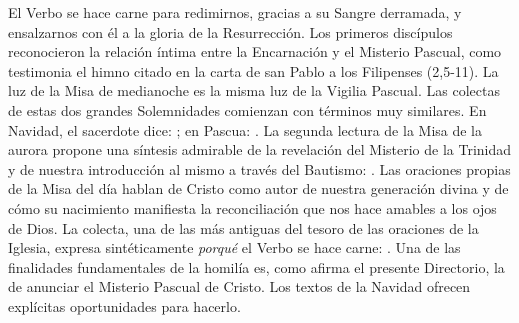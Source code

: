 \begin{body}
\begin{body}
El Verbo se hace carne para redimirnos, gracias a su Sangre derramada, y ensalzarnos con él a la gloria de la Resurrección. Los primeros discípulos reconocieron la relación íntima entre la Encarnación y el Misterio Pascual, como testimonia el himno citado en la carta de san Pablo a los Filipenses (2,5-11). La luz de la Misa de medianoche es la misma luz de la Vigilia Pascual. Las colectas de estas dos grandes Solemnidades comienzan con términos muy similares. En Navidad, el sacerdote dice: ; en Pascua: . La segunda lectura de la Misa de la aurora propone una síntesis admirable de la revelación del Misterio de la Trinidad y de nuestra introducción al mismo a través del Bautismo: . Las oraciones propias de la Misa del día hablan de Cristo como autor de nuestra generación divina y de cómo su nacimiento manifiesta la reconciliación que nos hace amables a los ojos de Dios. La colecta, una de las más antiguas del tesoro de las oraciones de la Iglesia, expresa sintéticamente \emph{porqué} el Verbo se hace carne: . Una de las finalidades fundamentales de la homilía es, como afirma el presente Directorio, la de anunciar el Misterio Pascual de Cristo. Los textos de la Navidad ofrecen explícitas oportunidades para hacerlo.


\end{body}
\end{body}
